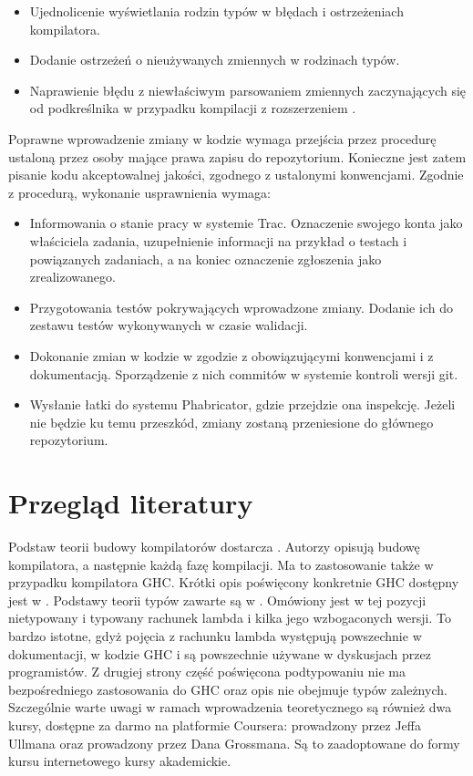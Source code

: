 \begin{itemize}
 \item Ujednolicenie wyświetlania rodzin typów w błędach i ostrzeżeniach kompilatora.
 \item Dodanie ostrzeżeń o nieużywanych zmiennych w rodzinach typów.
 \item Naprawienie błędu z niewłaściwym parsowaniem zmiennych zaczynających się od podkreślnika w przypadku kompilacji z rozszerzeniem .
\end{itemize}

Poprawne wprowadzenie zmiany w kodzie wymaga przejścia przez procedurę ustaloną
przez osoby mające prawa zapisu do repozytorium\cite{WikiFixingBugs}. Konieczne
jest zatem pisanie kodu akceptowalnej jakości, zgodnego z ustalonymi konwencjami.
Zgodnie z procedurą, wykonanie usprawnienia wymaga:

\begin{itemize}
  \item Informowania o stanie pracy w systemie Trac. Oznaczenie swojego konta jako właściciela zadania, uzupełnienie informacji na przykład o testach i powiązanych zadaniach, a na koniec oznaczenie zgłoszenia jako zrealizowanego.
  \item Przygotowania testów pokrywających wprowadzone zmiany. Dodanie ich do zestawu testów wykonywanych w czasie walidacji.
  \item Dokonanie zmian w kodzie w zgodzie z obowiązującymi konwencjami i z dokumentacją. Sporządzenie z nich commitów w systemie kontroli wersji git.
  \item Wysłanie łatki do systemu Phabricator, gdzie przejdzie ona inspekcję. Jeżeli nie będzie ku temu przeszkód, zmiany zostaną przeniesione do głównego repozytorium.
\end{itemize}

\section{Przegląd literatury}\label{sec:przeglad_literatury}

Podstaw teorii budowy kompilatorów dostarcza \cite{Dragon}. Autorzy opisują
budowę kompilatora, a następnie każdą fazę kompilacji. Ma to zastosowanie także
w przypadku kompilatora GHC. Krótki opis poświęcony konkretnie GHC dostępny jest
w \cite{AOSA}. Podstawy teorii typów zawarte są w \cite{TAPL}. Omówiony jest w
tej pozycji nietypowany i typowany rachunek lambda i kilka jego wzbogaconych
wersji. To bardzo istotne, gdyż pojęcia z rachunku lambda występują powszechnie
w dokumentacji, w kodzie GHC i są powszechnie używane w dyskusjach przez
programistów. Z drugiej strony część poświęcona podtypowaniu nie ma
bezpośredniego zastosowania do GHC oraz opis nie obejmuje typów
zależnych. Szczególnie warte uwagi w ramach wprowadzenia teoretycznego są
również dwa kursy, dostępne za darmo na platformie Coursera: 
prowadzony przez Jeffa Ullmana oraz  prowadzony
przez Dana Grossmana. Są to zaadoptowane do formy kursu internetowego kursy
akademickie.


